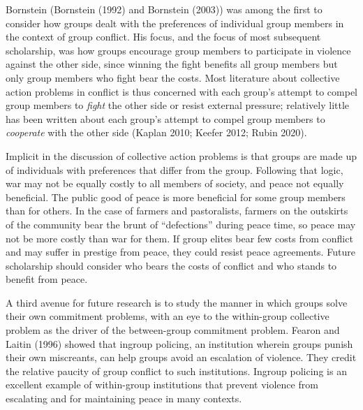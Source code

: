 \documentclass[11pt]{article}
\begin{document}
Bornstein (Bornstein (1992) and Bornstein (2003)) was among the first to
consider how groups dealt with the preferences of individual group
members in the context of group conflict. His focus, and the focus of
most subsequent scholarship, was how groups encourage group members to
participate in violence against the other side, since winning the fight
benefits all group members but only group members who fight bear the
costs. Most literature about collective action problems in conflict is
thus concerned with each group's attempt to compel group members to
\emph{fight} the other side or resist external pressure; relatively
little has been written about each group's attempt to compel group
members to \emph{cooperate} with the other side (Kaplan 2010; Keefer
2012; Rubin 2020).

Implicit in the discussion of collective action problems is that groups
are made up of individuals with preferences that differ from the group.
Following that logic, war may not be equally costly to all members of
society, and peace not equally beneficial. The public good of peace is
more beneficial for some group members than for others. In the case of
farmers and pastoralists, farmers on the outskirts of the community bear
the brunt of ``defections'' during peace time, so peace may not be more
costly than war for them. If group elites bear few costs from conflict
and may suffer in prestige from peace, they could resist peace
agreements. Future scholarship should consider who bears the costs of
conflict and who stands to benefit from peace.

A third avenue for future research is to study the manner in which
groups solve their own commitment problems, with an eye to the
within-group collective problem as the driver of the between-group
commitment problem. Fearon and Laitin (1996) showed that ingroup
policing, an institution wherein groups punish their own miscreants, can
help groups avoid an escalation of violence. They credit the relative
paucity of group conflict to such institutions. Ingroup policing is an
excellent example of within-group institutions that prevent violence
from escalating and for maintaining peace in many contexts.
\end{document}
